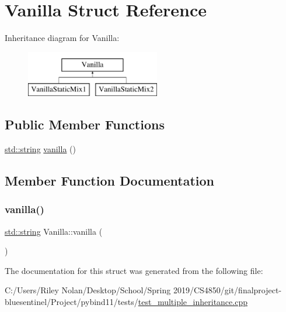 \hypertarget{struct_vanilla}{}\section{Vanilla Struct Reference}
\label{struct_vanilla}
Inheritance diagram for Vanilla\+:\begin{figure}[H]
\begin{center}
\leavevmode
\includegraphics[height=2.000000cm]{struct_vanilla}
\end{center}
\end{figure}
\subsection*{Public Member Functions}
\begin{DoxyCompactItemize}
\item 
\mbox{\hyperlink{_s_d_l__opengl__glext_8h_ab4ccfaa8ab0e1afaae94dc96ef52dde1}{std\+::string}} \mbox{\hyperlink{struct_vanilla_a4842bfe5dc2ba0fa067dc49cb0656ef4}{vanilla}} ()
\end{DoxyCompactItemize}


\subsection{Member Function Documentation}
\mbox{\label{struct_vanilla_a4842bfe5dc2ba0fa067dc49cb0656ef4}} 
\subsubsection{\texorpdfstring{vanilla()}{vanilla()}}
{\footnotesize\ttfamily \mbox{\hyperlink{_s_d_l__opengl__glext_8h_ab4ccfaa8ab0e1afaae94dc96ef52dde1}{std\+::string}} Vanilla\+::vanilla (\begin{DoxyParamCaption}{ }\end{DoxyParamCaption})\hspace{0.3cm}{\ttfamily [inline]}}



The documentation for this struct was generated from the following file\+:\begin{DoxyCompactItemize}
\item 
C\+:/\+Users/\+Riley Nolan/\+Desktop/\+School/\+Spring 2019/\+C\+S4850/git/finalproject-\/bluesentinel/\+Project/pybind11/tests/\mbox{\hyperlink{test__multiple__inheritance_8cpp}{test\+\_\+multiple\+\_\+inheritance.\+cpp}}\end{DoxyCompactItemize}
